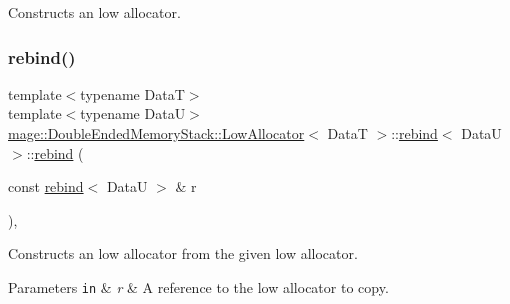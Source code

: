 Constructs an low allocator. \hypertarget{structmage_1_1_double_ended_memory_stack_1_1_low_allocator_1_1rebind_a1799f1e7ba9543496e9624d522087695}{}\label{structmage_1_1_double_ended_memory_stack_1_1_low_allocator_1_1rebind_a1799f1e7ba9543496e9624d522087695} 
\subsubsection{\texorpdfstring{rebind()}{rebind()}\hspace{0.1cm}{\footnotesize\ttfamily [2/3]}}
{\footnotesize\ttfamily template$<$typename DataT$>$ \\
template$<$typename DataU$>$ \\
\hyperlink{structmage_1_1_double_ended_memory_stack_1_1_low_allocator}{mage\+::\+Double\+Ended\+Memory\+Stack\+::\+Low\+Allocator}$<$ DataT $>$\+::\hyperlink{structmage_1_1_double_ended_memory_stack_1_1_low_allocator_1_1rebind}{rebind}$<$ DataU $>$\+::\hyperlink{structmage_1_1_double_ended_memory_stack_1_1_low_allocator_1_1rebind}{rebind} (\begin{DoxyParamCaption}\item[{const \hyperlink{structmage_1_1_double_ended_memory_stack_1_1_low_allocator_1_1rebind}{rebind}$<$ DataU $>$ \&}]{r }\end{DoxyParamCaption})\hspace{0.3cm}{\ttfamily [private]}, {\ttfamily [delete]}}

Constructs an low allocator from the given low allocator.


\begin{DoxyParams}[1]{Parameters}
\mbox{\tt in}  & {\em r} & A reference to the low allocator to copy. \\
\hline
\end{DoxyParams}
\hypertarget{structmage_1_1_double_ended_memory_stack_1_1_low_allocator_1_1rebind_abea4a27c89b8c8db309693b80d1023bb}{}\label{structmage_1_1_double_ended_memory_stack_1_1_low_allocator_1_1rebind_abea4a27c89b8c8db309693b80d1023bb} 
